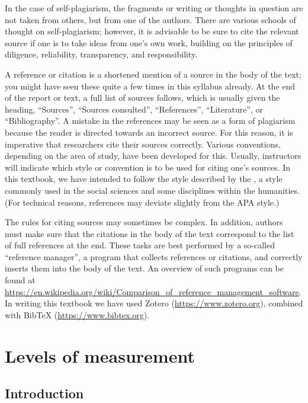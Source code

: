 \documentclass[
]{book}
\begin{document}
In the case of self-plagiarism, the fragments or writing or thoughts in question are not taken from others, but from one of the authors. There are various schools of thought on self-plagiarism; however, it is advisable to be sure to cite the relevant source if one is to take ideas from one's own work, building on the principles of diligence, reliability, transparency, and responsibility.

A reference or citation is a shortened mention of a source in the body of the text; you might have seen these quite a few times in this syllabus already. At the end of the report or text, a full list of sources follows, which is usually given the heading, ``Sources'', ``Sources consulted'', ``References'', ``Literature'', or ``Bibliography''. A mistake in the references may be seen as a form of plagiarism \citep{UBVU15} because the reader is directed towards an incorrect source. For this reason, it is imperative that researchers cite their sources correctly. Various conventions, depending on the area of study, have been developed for this. Usually, instructors will indicate which style or convention is to be used for citing one's sources. In this textbook, we have intended to follow the style described by the \citet{APA10}, a style commonly used in the social sciences and some disciplines within the humanities.
(For technical reasons, references may deviate slightly from the APA style.)

The rules for citing sources may sometimes be complex. In addition, authors must make sure that the citations in the body of the text correspond to the list of full references at the end. These tasks are best performed by a so-called ``reference manager'', a program that collects references or citations, and correctly inserts them into the body of the text. An overview of such programs can be found at
\url{https://en.wikipedia.org/wiki/Comparison_of_reference_management_software}.
In writing this textbook we have used Zotero (\url{https://www.zotero.org}),
combined with BibTeX (\url{https://www.bibtex.org}).

\hypertarget{ch:levelsofmeasurement}{%
\chapter{Levels of measurement}\label{ch:levelsofmeasurement}}

\hypertarget{introduction-1}{%
\section{Introduction}\label{introduction-1}}
\end{document}
